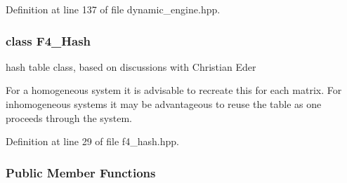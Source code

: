 Definition at line 137 of file dynamic\+\_\+engine.\+hpp.

\label{class_f4___hash}
\subsubsection{class F4\+\_\+\+Hash}
hash table class, based on discussions with Christian Eder 

For a homogeneous system it is advisable to recreate this for each matrix. For inhomogeneous systems it may be advantageous to reuse the table as one proceeds through the system. 

Definition at line 29 of file f4\+\_\+hash.\+hpp.

\subsubsection*{Public Member Functions}
